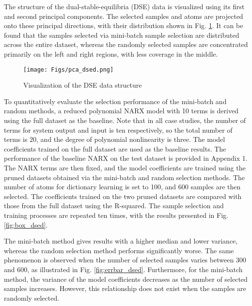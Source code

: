 \documentclass{article}
\begin{document}
The structure of the dual-stable-equilibria (DSE) data is visualized using its first and second principal components. The selected samples and atoms are projected onto these principal directions, with their distribution shown in Fig. \ref{fig:pca_dsed}.
It can be found that the samples selected via mini-batch sample selection are distributed across the entire dataset, whereas the randomly selected samples are concentrated primarily on the left and right regions, with less coverage in the middle.

\begin{figure}[htpb]
    \centering
    \texttt{[image: Figs/pca\_dsed.png]}
    \caption{Visualization of the DSE data structure}
    \label{fig:pca_dsed}
\end{figure}

To quantitatively evaluate the selection performance of the mini-batch and random methods, a reduced polynomial NARX model with 10 terms is derived using the full dataset as the baseline. 
Note that in all case studies, the number of terms for system output and input is ten respectively, so the total number of terms is $20$, and the degree of polynomial nonlinearity is three. 
The model coefficients trained on the full dataset are used as the baseline results.
The performance of the baseline NARX on the test dataset is provided in Appendix 1. 
The NARX terms are then fixed, and the model coefficients are trained using the pruned datasets obtained via the mini-batch and random selection methods. 
The number of atoms for dictionary learning is set to 100, and 600 samples are then selected. 
The coefficients trained on the two pruned datasets are compared with those from the full dataset using the R-squared. 
The sample selection and training processes are repeated ten times, with the results presented in Fig. \ref{fig:box_dsed}. 

The mini-batch method gives results with a higher median and lower variance, whereas the random selection method performs significantly worse. 
The same phenomenon is observed when the number of selected samples varies between 300 and 600, as illustrated in Fig. \ref{fig:errbar_dsed}.
Furthermore, for the mini-batch method, the variance of the model coefficients decreases as the number of selected samples increases. However, this relationship does not exist when the samples are randomly selected.
\end{document}
